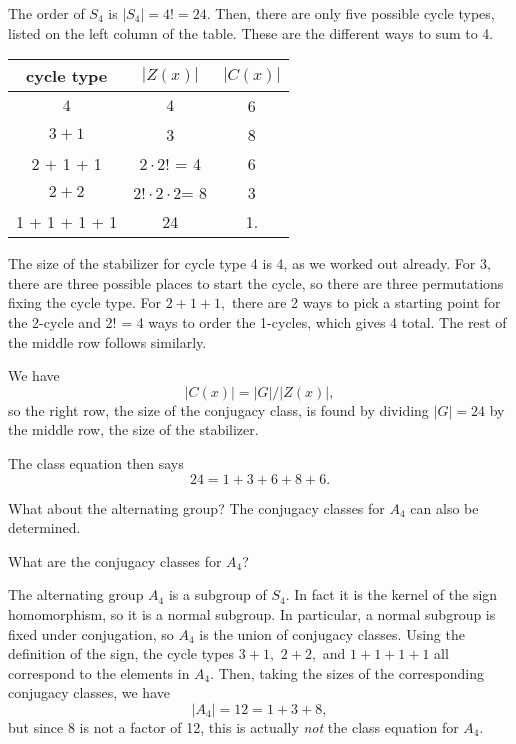 \begin{example}
The order of $S_4$ is $|S_4| = 4! =24.$ Then, there are only five possible cycle types, listed on the left column of the table. These are the different ways to sum to 4.


\begin{center}
    \begin{tabular}{c|c|c}
        cycle type & $|Z(x)|$ & $|C(x)|$ \\
        \hline 
        $4$ &  $4$ & 6 \\
        $3 + 1 $& 3& 8\\
        2 + 1 + 1 & $2\cdot 2!$ = 4 & 6 \\
        $2 + 2$ & $2! \cdot 2 \cdot 2 $= 8 & 3\\
        1 + 1 + 1 + 1 & 24 & 1.
    \end{tabular}
\end{center}

The size of the stabilizer for cycle type 4 is 4, as we worked out already. For 3, there are three possible places to start the cycle, so there are three permutations fixing the cycle type. For $2 + 1 + 1,$ there are 2 ways to pick a starting point for the 2-cycle and 2! = 4 ways to order the 1-cycles, which gives 4 total. The rest of the middle row follows similarly. 

We have \[|C(x)| = |G|/|Z(x)|,\] so the right row, the size of the conjugacy class, is found by dividing $|G| = 24$ by the middle row, the size of the stabilizer. 

The class equation then says 
\[
\boxed{24 = 1 + 3 + 6 + 8 + 6.}
\]
\end{example}

What about the alternating group? The conjugacy classes for $A_4$ can also be determined.
\begin{example}
What are the conjugacy classes for $A_4$?
\end{example}
The alternating group $A_4$ is a subgroup of $S_4.$ In fact it is the kernel of the sign homomorphism, so it is a normal subgroup. In particular, a normal subgroup is fixed under conjugation, so $A_4$ is the union of conjugacy classes. Using the definition of the sign, the cycle types $3 + 1,$ $2 + 2,$ and $1 + 1 + 1 + 1$ all correspond to the elements in $A_4.$ Then, taking the sizes of the corresponding conjugacy classes, we have
\[
|A_4| = 12 = 1 + 3 + 8,
\]
but since 8 is not a factor of 12, this is actually \emph{not} the class equation for $A_4.$ 

